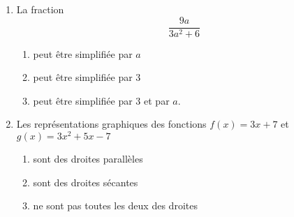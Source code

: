 \begin{exercice}[\ldots/4]
\begin{multicols}{2}
\begin{enumerate}
\item

    La fraction
    \begin{equation*}
        \frac{ 9a }{ 3a^2+6 }
    \end{equation*}
    
    \begin{enumerate}
        \item
            peut être simplifiée par \( a\)
        \item
            peut être simplifiée par \( 3\)
        \item
            peut être simplifiée par \( 3\) et par \( a\).
    \end{enumerate}

\item

    Les représentations graphiques des fonctions \( f(x)=3x+7\) et \( g(x)=3x^2+5x-7\)
    \begin{enumerate}
        \item
            sont des droites parallèles
        \item
            sont des droites sécantes
        \item
            ne sont pas toutes les deux des droites
    \end{enumerate}

    \end{enumerate}
    \end{multicols}

\end{exercice}
